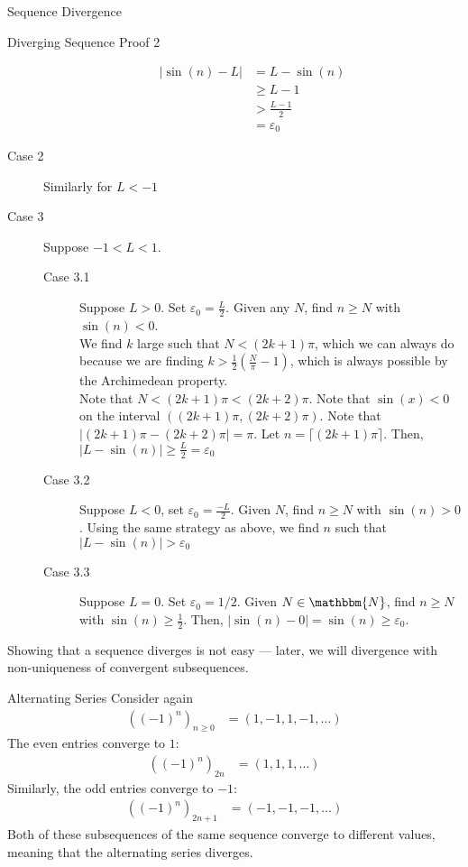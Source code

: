 \documentclass[10pt]{extarticle}
\newcommand{\N}{\mathbbm{N}}
\begin{document}
\begin{problem}{Sequence Divergence}
\begin{problem}{Diverging Sequence Proof 2}
\begin{description}
          \begin{align*}
            |\sin(n)-L| &= L-\sin(n)\\
                        &\geq L-1\\
                        &> \frac{L-1}{2}\\
                        &= \varepsilon_0
          \end{align*}
        \item[Case 2] Similarly for $L < -1$
        \item[Case 3] Suppose $-1 < L < 1$.
          \begin{description}
            \item[Case 3.1] Suppose $L > 0$. Set $\varepsilon_0 = \frac{L}{2}$. Given any $N$, find $n \geq N$ with $\sin(n) < 0$. \\

              We find $k$ large such that $N < (2k+1)\pi$, which we can always do because we are finding $k > \frac{1}{2}\left(\frac{N}{\pi} - 1\right)$, which is always possible by the Archimedean property.\\

              Note that $N < (2k+1)\pi < (2k+2)\pi$. Note that $\sin(x) < 0$ on the interval $((2k+1)\pi,(2k+2)\pi)$. Note that $|(2k+1)\pi - (2k+2)\pi| = \pi$. Let $n = \lceil (2k+1)\pi\rceil$. Then, $|L-\sin(n)| \geq \frac{L}{2} = \varepsilon_0$
            \item[Case 3.2] Suppose $L < 0$, set $\varepsilon_0 = \frac{-L}{2}$. Given $N$, find $n \geq N$ with $\sin(n) > 0$. Using the same strategy as above, we find $n$ such that $|L - \sin(n)| > \varepsilon_0$
            \item[Case 3.3] Suppose $L = 0$. Set $\varepsilon_0 = 1/2$. Given $N\in\N$, find $n\geq N$ with $\sin(n) \geq \frac{1}{2}$. Then, $|\sin(n)-0| = \sin(n) \geq \varepsilon_0$.
          \end{description}
      \end{description}
    \end{problem}
    Showing that a sequence diverges is not easy --- later, we will divergence with non-uniqueness of convergent subsequences.
  \end{problem}
  \begin{problem}{Alternating Series}
    Consider again
    \begin{align*}
      \left((-1)^n\right)_{n\geq 0} &= (1,-1,1,-1,\dots)
    \end{align*}
    The even entries converge to $1$:
    \begin{align*}
      \left((-1)^n\right)_{2n} &= (1,1,1,\dots)
    \end{align*}
    Similarly, the odd entries converge to $-1$:
    \begin{align*}
      \left((-1)^n\right)_{2n+1} &= (-1,-1,-1,\dots)
    \end{align*}
    Both of these subsequences of the same sequence converge to different values, meaning that the alternating series diverges.
  \end{problem}
\end{document}
